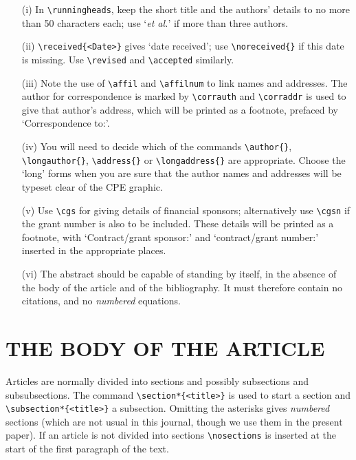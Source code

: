 \documentclass{cpeauth}
\begin{document}
\begin{enumerate}
\item[(i)]
In \verb"\runningheads", keep the short title and the authors' details
to no more than 50 characters each; use `\emph{et al.}' if more than three authors.
\item[(ii)]
\verb"\received{<Date>}" gives `date received';
use \verb"\noreceived{}" if this date is missing.
Use \verb"\revised" and \verb"\accepted" similarly.
\item[(iii)]
Note the use of \verb"\affil" and \verb"\affilnum"
to link names and addresses.
The author for correspondence is marked by \verb"\corrauth"
and \verb"\corraddr" is used to give that author's address,
which will be printed as a footnote, prefaced by `Correspondence to:'.
\item[(iv)] You will need to decide which of the commands \verb"\author{}",
\verb"\longauthor{}", \verb"\address{}" or \verb"\longaddress{}" are
appropriate. Choose the `long' forms when you are sure that the author
names and addresses will be typeset clear of the CPE graphic.
\item[(v)]
Use \verb"\cgs" for giving details of financial sponsors; alternatively
use \verb"\cgsn" if the grant number is also to be included.
These details will be printed as a footnote,
with `Contract/grant sponsor:' and `contract/grant number:'
inserted in the appropriate places.
\item[(vi)]
The abstract should be capable of standing by itself, in the absence
of the body of the article and of the bibliography.  It must therefore
contain no citations, and no \emph{numbered} equations.
\end{enumerate}

\section{THE BODY OF THE ARTICLE}
Articles are normally divided into sections
and possibly subsections and subsubsections.
The command \verb"\section*{<title>}" is used to start a section
and \verb"\subsection*{<title>}" a subsection.
Omitting the asterisks gives \emph{numbered} sections
(which are not usual in this journal,
though we use them in the present paper). %
If an article is not divided into sections \verb"\nosections" is inserted
at the start of the first paragraph of the text.
\end{document}
